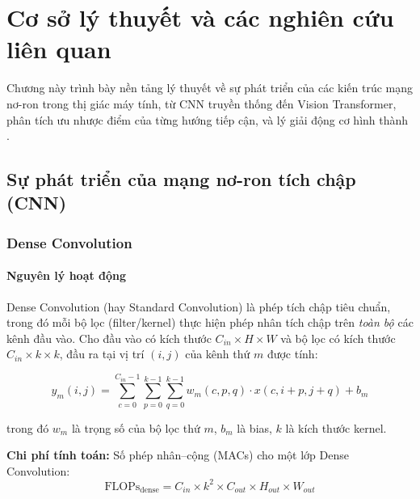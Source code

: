 \chapter{Cơ sở lý thuyết và các nghiên cứu liên quan}
\label{chap:background}

Chương này trình bày nền tảng lý thuyết về sự phát triển của các kiến trúc mạng nơ-ron trong thị giác máy tính, từ CNN truyền thống đến Vision Transformer, phân tích ưu nhược điểm của từng hướng tiếp cận, và lý giải động cơ hình thành \fastvit{}.

\section{Sự phát triển của mạng nơ-ron tích chập (CNN)}
\label{sec:cnn_evolution}

\subsection{Dense Convolution}
\label{subsec:dense_conv}

\subsubsection*{Nguyên lý hoạt động}

Dense Convolution (hay Standard Convolution) là phép tích chập tiêu chuẩn, trong đó mỗi bộ lọc (filter/kernel) thực hiện phép nhân tích chập trên \textit{toàn bộ} các kênh đầu vào. Cho đầu vào có kích thước $C_{in} \times H \times W$ và bộ lọc có kích thước $C_{in} \times k \times k$, đầu ra tại vị trí $(i, j)$ của kênh thứ $m$ được tính:

\begin{equation}
    y_m(i, j) = \sum_{c=0}^{C_{in}-1} \sum_{p=0}^{k-1} \sum_{q=0}^{k-1} w_m(c, p, q) \cdot x(c, i+p, j+q) + b_m
    \label{eq:dense_conv}
\end{equation}

\noindent trong đó $w_m$ là trọng số của bộ lọc thứ $m$, $b_m$ là bias, $k$ là kích thước kernel.

\textbf{Chi phí tính toán:} Số phép nhân--cộng (MACs) cho một lớp Dense Convolution:
\begin{equation}
    \text{FLOPs}_{\text{dense}} = C_{in} \times k^2 \times C_{out} \times H_{out} \times W_{out}
    \label{eq:flops_dense}
\end{equation}

